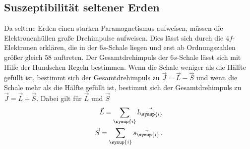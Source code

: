 \subsection{Suszeptibilität seltener Erden}
\label{sec:selteneErden}
Da seltene Erden einen starken Paramagnetismus aufweisen, müssen die Elektronenhüllen große Drehimpulse aufweisen.
Dies lässt sich durch die $4f$-Elektronen erklären, die in der $6s$-Schale liegen und erst ab Ordnungszahlen größer
gleich $58$ auftreten. Der Gesamtdrehimpuls der $6s$-Schale lässt sich mit Hilfe der Hundschen Regeln bestimmen.
Wenn die Schale weniger als die Hälfte gefüllt ist, bestimmt sich der Gesamtdrehimpuls zu $\vec{J}=\vec{L}-\vec{S}$
und wenn die Schale mehr als die Hälfte gefüllt ist, bestimmt sich der Gesamtdrehimpuls zu
$\vec{J}=\vec{L}+\vec{S}$. Dabei gilt für $\vec{L}$ und $\vec{S}$
\begin{align*}
    \vec{L} = \sum_{\symup{i}} \vec{l_{\symup{i}}}\\
    \vec{S} = \sum_{\symup{i}} \vec{s_{\symup{i}}}\,.
\end{align*}

